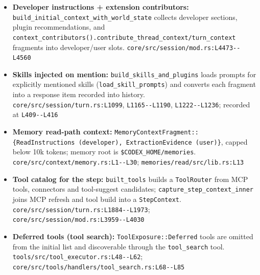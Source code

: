 \begin{itemize}
\item \textbf{Developer instructions + extension contributors:} \texttt{build\_\allowbreak{}initial\_\allowbreak{}context\_\allowbreak{}with\_\allowbreak{}world\_\allowbreak{}state} collects developer sections, plugin recommendations, and \texttt{context\_\allowbreak{}contributors(\allowbreak{}).\allowbreak{}contribute\_\allowbreak{}thread\_\allowbreak{}context/\allowbreak{}turn\_\allowbreak{}context} fragments into developer/user slots. \texttt{core/\allowbreak{}src/\allowbreak{}session/\allowbreak{}mod.\allowbreak{}rs:\allowbreak{}L4473-\allowbreak{}-\allowbreak{}L4560}
\item \textbf{Skills injected on mention:} \texttt{build\_\allowbreak{}skills\_\allowbreak{}and\_\allowbreak{}plugins} loads prompts for explicitly mentioned skills (\texttt{load\_\allowbreak{}skill\_\allowbreak{}prompts}) and converts each fragment into a response item recorded into history. \texttt{core/\allowbreak{}src/\allowbreak{}session/\allowbreak{}turn.\allowbreak{}rs:\allowbreak{}L1099}, \texttt{L1165-\allowbreak{}-\allowbreak{}L1190}, \texttt{L1222-\allowbreak{}-\allowbreak{}L1236}; recorded at \texttt{L409-\allowbreak{}-\allowbreak{}L416}
\item \textbf{Memory read-path context:} \texttt{MemoryContextFragment:\allowbreak{}:\allowbreak{}\{ReadInstructions (\allowbreak{}developer), ExtractionEvidence (\allowbreak{}user)\}}, capped below 10k tokens; memory root is \texttt{\$CODEX\_\allowbreak{}HOME/\allowbreak{}memories}. \texttt{core/\allowbreak{}src/\allowbreak{}context/\allowbreak{}memory.\allowbreak{}rs:\allowbreak{}L1-\allowbreak{}-\allowbreak{}L30}; \texttt{memories/\allowbreak{}read/\allowbreak{}src/\allowbreak{}lib.\allowbreak{}rs:\allowbreak{}L13}
\item \textbf{Tool catalog for the step:} \texttt{built\_\allowbreak{}tools} builds a \texttt{ToolRouter} from MCP tools, connectors and tool-suggest candidates; \texttt{capture\_\allowbreak{}step\_\allowbreak{}context\_\allowbreak{}inner} joins MCP refresh and tool build into a \texttt{StepContext}. \texttt{core/\allowbreak{}src/\allowbreak{}session/\allowbreak{}turn.\allowbreak{}rs:\allowbreak{}L1884-\allowbreak{}-\allowbreak{}L1973}; \texttt{core/\allowbreak{}src/\allowbreak{}session/\allowbreak{}mod.\allowbreak{}rs:\allowbreak{}L3959-\allowbreak{}-\allowbreak{}L4030}
\item \textbf{Deferred tools (tool search):} \texttt{ToolExposure:\allowbreak{}:\allowbreak{}Deferred} tools are omitted from the initial list and discoverable through the \texttt{tool\_\allowbreak{}search} tool. \texttt{tools/\allowbreak{}src/\allowbreak{}tool\_\allowbreak{}executor.\allowbreak{}rs:\allowbreak{}L48-\allowbreak{}-\allowbreak{}L62}; \texttt{core/\allowbreak{}src/\allowbreak{}tools/\allowbreak{}handlers/\allowbreak{}tool\_\allowbreak{}search.\allowbreak{}rs:\allowbreak{}L68-\allowbreak{}-\allowbreak{}L85}

\end{itemize}
